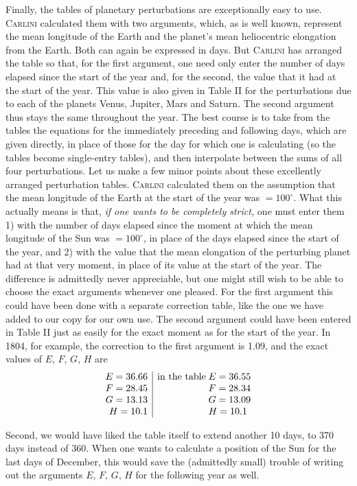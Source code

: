 Finally, the tables of planetary perturbations are exceptionally easy to use. \textsc{Carlini} calculated them with two arguments, which, as is well known, represent the mean longitude of the Earth and the planet's mean heliocentric elongation from the Earth. Both can again be expressed in days. But \textsc{Carlini} has arranged the table so that, for the first argument, one need only enter the number of days elapsed since the start of the year and, for the second, the value that it had at the start of the year. This value is also given in Table II for the perturbations due to each of the planets Venus, Jupiter, Mars and Saturn. The second argument thus stays the same throughout the year. The best course is to take from the tables the equations for the immediately preceding and following days, which are given directly, in place of those for the day for which one is calculating (so the tables become single-entry tables), and then interpolate between the sums of all four perturbations. Let us make a few minor points about these excellently arranged perturbation tables. \textsc{Carlini} calculated them on the assumption that the mean longitude of the Earth at the start of the year was $= 100^\circ$. What this actually means is that, \emph{if one wants to be completely strict,} one must enter them 1) with the number of days elapsed since the moment at which the mean longitude of the Sun was $= 100^\circ$, in place of the days elapsed since the start of the year, and 2) with the value that the mean elongation of the perturbing planet had at that very moment, in place of its value at the start of the year. The difference is admittedly never appreciable, but one might still wish to be able to choose the exact arguments whenever one pleased. For the first argument this could have been done with a separate correction table, like the one we have added to our copy for our own use. The second argument could have been entered in Table II just as easily for the exact moment as for the start of the year. In 1804, for example, the correction to the first argument is 1.09, and the exact values of $E$, $F$, $G$, $H$ are \[ \begin{array}{r|l@{\;}l} E = 36.66 & \text{in the table} & E = 36.55\\ F = 28.45 & & F = 28.34\\ G = 13.13 & & G = 13.09\\ H = 10.1 & & H = 10.1 \end{array} \]

Second, we would have liked the table itself to extend another 10 days, to 370 days instead of 360. When one wants to calculate a position of the Sun for the last days of December, this would save the (admittedly small) trouble of writing out the arguments $E$, $F$, $G$, $H$ for the following year as well.

